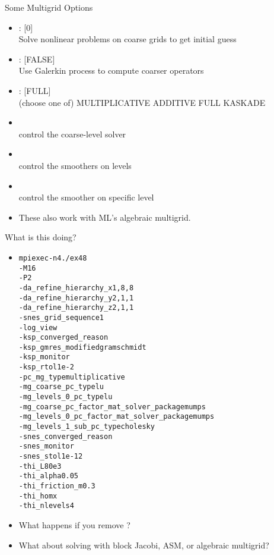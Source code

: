 


\begin{frame}{Some Multigrid Options}
  \begin{itemize}
  \item {}: [0] \\
    Solve nonlinear problems on coarse grids to get initial guess
  \item {}: [FALSE] \\
    Use Galerkin process to compute coarser operators
  \item {}: [FULL] \\
    (choose one of) MULTIPLICATIVE ADDITIVE FULL KASKADE
  \item {} \\
    control the coarse-level solver
  \item {} \\
    control the smoothers on levels
  \item {} \\
    control the smoother on specific level
  \item These also work with ML's algebraic multigrid.
  \end{itemize}
\end{frame}

\begin{frame}{What is this doing?}
\begin{itemize}
\item
\begin{alltt}\footnotesize
mpiexec -n 4 ./ex48
-M 16
-P 2
-da\_refine\_hierarchy\_x 1,8,8 \\
-da\_refine\_hierarchy\_y 2,1,1
-da\_refine\_hierarchy\_z 2,1,1 \\
-snes\_grid\_sequence 1
-log\_view \\
-ksp\_converged\_reason
-ksp\_gmres\_modifiedgramschmidt \\
-ksp\_monitor
-ksp\_rtol 1e-2 \\
-pc\_mg\_type multiplicative \\
-mg\_coarse\_pc\_type lu
-mg\_levels\_0\_pc\_type lu \\
-mg\_coarse\_pc\_factor\_mat\_solver\_package mumps \\
-mg\_levels\_0\_pc\_factor\_mat\_solver\_package mumps \\
-mg\_levels\_1\_sub\_pc\_type cholesky \\
-snes\_converged\_reason
-snes\_monitor
-snes\_stol 1e-12 \\
-thi\_L 80e3
-thi\_alpha 0.05
-thi\_friction\_m 0.3 \\
-thi\_hom x
-thi\_nlevels 4
\end{alltt}
\item What happens if you remove ?
\item What about solving with block Jacobi, ASM, or algebraic multigrid?
\end{itemize}
\end{frame}
